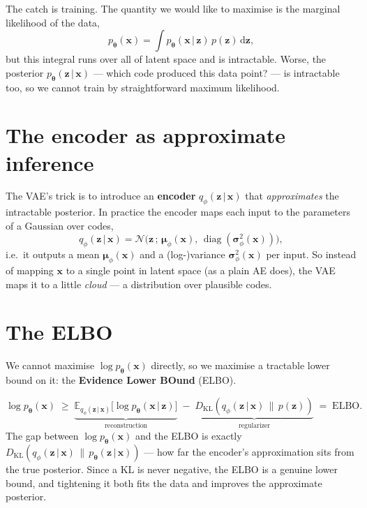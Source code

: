 \documentclass[11pt, oneside]{book}
\newcommand{\E}{\mathbb{E}}              %
\newcommand{\KL}[2]{D_{\mathrm{KL}}\!\left(#1 \,\|\, #2\right)}
\newcommand{\dd}{\,\mathrm{d}}
\newcommand{\diag}{\operatorname{diag}}
\newcommand{\params}{\boldsymbol{\theta}}
\newcommand{\xvec}{\mathbf{x}}
\newcommand{\zvec}{\mathbf{z}}
\newcommand{\Normal}{\mathcal{N}}
\newcommand{\given}{\,\vert\,}
\begin{document}
The catch is training. The quantity we would like to maximise is the marginal
likelihood of the data,
\[
  p_{\params}(\xvec) = \int p_{\params}(\xvec \given \zvec)\, p(\zvec) \dd\zvec ,
\]
but this integral runs over all of latent space and is intractable. Worse, the
posterior $p_{\params}(\zvec \given \xvec)$ --- which code produced this data
point? --- is intractable too, so we cannot train by straightforward maximum
likelihood.

\section{The encoder as approximate inference}

The VAE's trick is to introduce an \textbf{encoder} $q_{\phi}(\zvec \given \xvec)$
that \emph{approximates} the intractable posterior. In practice the encoder maps
each input to the parameters of a Gaussian over codes,
\[
  q_{\phi}(\zvec \given \xvec)
  = \Normal\!\bigl(\zvec \,;\, \boldsymbol{\mu}_{\phi}(\xvec),\,
                   \diag(\boldsymbol{\sigma}^2_{\phi}(\xvec))\bigr),
\]
i.e.\ it outputs a mean $\boldsymbol{\mu}_{\phi}(\xvec)$ and a (log-)variance
$\boldsymbol{\sigma}^2_{\phi}(\xvec)$ per input. So instead of mapping $\xvec$ to a
single point in latent space (as a plain AE does), the VAE maps it to a little
\emph{cloud} --- a distribution over plausible codes.

\section{The ELBO}

We cannot maximise $\log p_{\params}(\xvec)$ directly, so we maximise a tractable
lower bound on it: the \textbf{Evidence Lower BOund} (ELBO).

\begin{thmbox}[title={Evidence Lower Bound}]
\[
  \log p_{\params}(\xvec)
  \;\ge\;
  \underbrace{\E_{q_{\phi}(\zvec \given \xvec)}\!\bigl[\log p_{\params}(\xvec \given \zvec)\bigr]}_{\text{reconstruction}}
  \;-\;
  \underbrace{\KL{q_{\phi}(\zvec \given \xvec)}{p(\zvec)}}_{\text{regularizer}}
  \;=\; \text{ELBO}.
\]
The gap between $\log p_{\params}(\xvec)$ and the ELBO is exactly
$\KL{q_{\phi}(\zvec \given \xvec)}{p_{\params}(\zvec \given \xvec)}$ --- how far the
encoder's approximation sits from the true posterior. Since a KL is never
negative, the ELBO is a genuine lower bound, and tightening it both fits the data
and improves the approximate posterior.
\end{thmbox}
\end{document}
